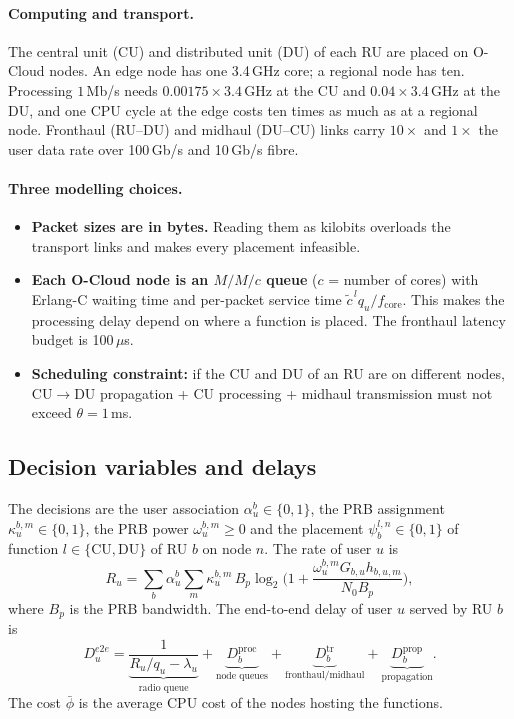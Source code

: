 \documentclass[11pt,oneside]{report}
\begin{document}
\paragraph{Computing and transport.}
The central unit (CU) and distributed unit (DU) of each RU are placed on O-Cloud nodes.
An edge node has one 3.4\,GHz core; a regional node has ten.
Processing $1$\,Mb/s needs $0.00175\times3.4$\,GHz at the CU and $0.04\times3.4$\,GHz at the DU, and one CPU cycle at the edge costs ten times as much as at a regional node.
Fronthaul (RU--DU) and midhaul (DU--CU) links carry $10\times$ and $1\times$ the user data rate over 100\,Gb/s and 10\,Gb/s fibre.

\paragraph{Three modelling choices.}
\begin{itemize}
	\item \textbf{Packet sizes are in bytes.} Reading them as kilobits overloads the transport links and makes every placement infeasible.
	\item \textbf{Each O-Cloud node is an $M/M/c$ queue} ($c$ = number of cores) with Erlang-C waiting time and per-packet service time $\tilde c^{\,l} q_u / f_{\text{core}}$. This makes the processing delay depend on where a function is placed. The fronthaul latency budget is 100\,$\mu$s.
	\item \textbf{Scheduling constraint:} if the CU and DU of an RU are on different nodes, CU$\to$DU propagation + CU processing + midhaul transmission must not exceed $\theta = 1$\,ms.
\end{itemize}

\subsection{Decision variables and delays}
The decisions are the user association $\alpha_{u}^{b}\in\{0,1\}$, the PRB assignment $\kappa_{u}^{b,m}\in\{0,1\}$, the PRB power $\omega_{u}^{b,m}\ge0$ and the placement $\psi_{b}^{l,n}\in\{0,1\}$ of function $l\in\{\mathrm{CU},\mathrm{DU}\}$ of RU $b$ on node $n$.
The rate of user $u$ is
\begin{equation}\label{eq:rate}
	R_u=\sum_{b}\alpha_u^b\sum_{m}\kappa_u^{b,m}\,B_p\log_2\!\Big(1+\frac{\omega_u^{b,m}G_{b,u}h_{b,u,m}}{N_0B_p}\Big),
\end{equation}
where $B_p$ is the PRB bandwidth.
The end-to-end delay of user $u$ served by RU $b$ is
\begin{equation}\label{eq:e2e}
	D_u^{e2e}=\underbrace{\frac{1}{R_u/q_u-\lambda_u}}_{\text{radio queue}}
	+\underbrace{D_b^{\text{proc}}}_{\text{node queues}}
	+\underbrace{D_b^{\text{tr}}}_{\text{fronthaul/midhaul}}
	+\underbrace{D_b^{\text{prop}}}_{\text{propagation}} .
\end{equation}
The cost $\bar\phi$ is the average CPU cost of the nodes hosting the functions.
\end{document}
